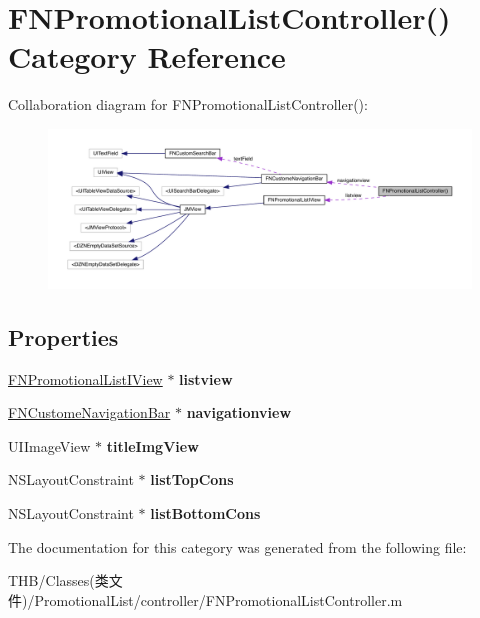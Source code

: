 \hypertarget{category_f_n_promotional_list_controller_07_08}{}\section{F\+N\+Promotional\+List\+Controller() Category Reference}
\label{category_f_n_promotional_list_controller_07_08}


Collaboration diagram for F\+N\+Promotional\+List\+Controller()\+:\nopagebreak
\begin{figure}[H]
\begin{center}
\leavevmode
\includegraphics[width=350pt]{category_f_n_promotional_list_controller_07_08__coll__graph}
\end{center}
\end{figure}
\subsection*{Properties}
\begin{DoxyCompactItemize}
\item 
\mbox{\label{category_f_n_promotional_list_controller_07_08_ac83a221eb49c69f32664f98d5caa08d2}} 
\mbox{\hyperlink{interface_f_n_promotional_list_i_view}{F\+N\+Promotional\+List\+I\+View}} $\ast$ {\bfseries listview}
\item 
\mbox{\label{category_f_n_promotional_list_controller_07_08_a0b68c581fce56231473ee03c2b0bf813}} 
\mbox{\hyperlink{interface_f_n_custome_navigation_bar}{F\+N\+Custome\+Navigation\+Bar}} $\ast$ {\bfseries navigationview}
\item 
\mbox{\label{category_f_n_promotional_list_controller_07_08_a2feb136152d200ad78a47e1350cb661f}} 
U\+I\+Image\+View $\ast$ {\bfseries title\+Img\+View}
\item 
\mbox{\label{category_f_n_promotional_list_controller_07_08_a04d953bc604dec06b0067a8b838138ef}} 
N\+S\+Layout\+Constraint $\ast$ {\bfseries list\+Top\+Cons}
\item 
\mbox{\label{category_f_n_promotional_list_controller_07_08_a31f7a10699e2005f9dac05aa4b3fc5b3}} 
N\+S\+Layout\+Constraint $\ast$ {\bfseries list\+Bottom\+Cons}
\end{DoxyCompactItemize}


The documentation for this category was generated from the following file\+:\begin{DoxyCompactItemize}
\item 
T\+H\+B/\+Classes(类文件)/\+Promotional\+List/controller/F\+N\+Promotional\+List\+Controller.\+m\end{DoxyCompactItemize}
